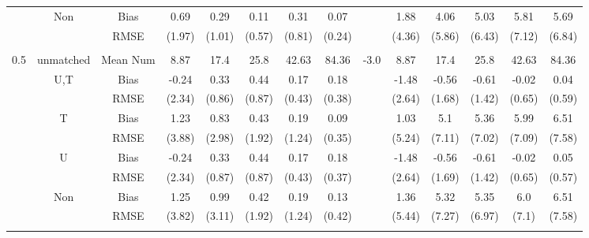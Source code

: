 \begin{tabular}{@{\extracolsep{5pt}}lc|cccccc|lccccc}
 & Non & Bias & 0.69 & 0.29 & 0.11 & 0.31 & 0.07 &  & 1.88 & 4.06 & 5.03 & 5.81 & 5.69 \\
 &  & RMSE & (1.97) & (1.01) & (0.57) & (0.81) & (0.24) &  & (4.36) & (5.86) & (6.43) & (7.12) & (6.84) \\
 &  &  &  &  &  &  &  &  &  &  &  &  &  \\
0.5 & unmatched & Mean Num & 8.87 & 17.4 & 25.8 & 42.63 & 84.36 & -3.0 & 8.87 & 17.4 & 25.8 & 42.63 & 84.36 \\
 & U,T & Bias & -0.24 & 0.33 & 0.44 & 0.17 & 0.18 &  & -1.48 & -0.56 & -0.61 & -0.02 & 0.04 \\
 &  & RMSE & (2.34) & (0.86) & (0.87) & (0.43) & (0.38) &  & (2.64) & (1.68) & (1.42) & (0.65) & (0.59) \\
 & T & Bias & 1.23 & 0.83 & 0.43 & 0.19 & 0.09 &  & 1.03 & 5.1 & 5.36 & 5.99 & 6.51 \\
 &  & RMSE & (3.88) & (2.98) & (1.92) & (1.24) & (0.35) &  & (5.24) & (7.11) & (7.02) & (7.09) & (7.58) \\
 & U & Bias & -0.24 & 0.33 & 0.44 & 0.17 & 0.18 &  & -1.48 & -0.56 & -0.61 & -0.02 & 0.05 \\
 &  & RMSE & (2.34) & (0.87) & (0.87) & (0.43) & (0.37) &  & (2.64) & (1.69) & (1.42) & (0.65) & (0.57) \\
 & Non & Bias & 1.25 & 0.99 & 0.42 & 0.19 & 0.13 &  & 1.36 & 5.32 & 5.35 & 6.0 & 6.51 \\
 &  & RMSE & (3.82) & (3.11) & (1.92) & (1.24) & (0.42) &  & (5.44) & (7.27) & (6.97) & (7.1) & (7.58) \\
 &  &  &  &  &  &  &  &  &  &  &  &  &  \\
\hline 
\bottomrule 
\end{tabular}
